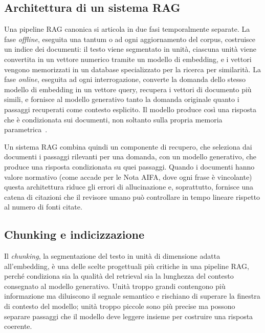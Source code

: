 \subsection{Architettura di un sistema RAG}
\label{subsec:rag-arch}

Una pipeline RAG canonica si articola in due fasi temporalmente separate.
La fase \emph{offline}, eseguita una tantum o ad ogni aggiornamento
del corpus, costruisce un indice dei documenti: il testo viene segmentato
in unità, ciascuna unità viene convertita in un vettore numerico tramite un
modello di embedding, e i vettori vengono memorizzati in un database
specializzato per la ricerca per similarità. La fase \emph{online}, eseguita
ad ogni interrogazione, converte la domanda dello stesso modello di
embedding in un vettore query, recupera i vettori di documento più simili,
e fornisce al modello generativo tanto la domanda originale quanto i passaggi
recuperati come contesto esplicito. Il modello produce così una risposta
che è condizionata sui documenti, non soltanto sulla propria memoria
parametrica~\cite{gao2023ragsurvey}.

Un sistema RAG combina quindi un componente di recupero, che seleziona dai
documenti i passaggi rilevanti per una domanda, con un modello generativo,
che produce una risposta condizionata su quei passaggi. Quando i documenti
hanno valore normativo (come accade per le Nota AIFA, dove ogni frase
è vincolante) questa architettura riduce gli errori di allucinazione e,
soprattutto, fornisce una catena di citazioni che il revisore umano può
controllare in tempo lineare rispetto al numero di fonti citate.

\subsection{Chunking e indicizzazione}
\label{subsec:chunking}

Il \emph{chunking}, la segmentazione del testo in unità di dimensione
adatta all'embedding, è una delle scelte progettuali più critiche in
una pipeline RAG, perché condiziona sia la qualità del retrieval sia la
lunghezza del contesto consegnato al modello generativo. Unità troppo grandi
contengono più informazione ma diluiscono il segnale semantico e rischiano
di superare la finestra di contesto del modello; unità troppo piccole sono
più precise ma possono separare passaggi che il modello deve leggere insieme
per costruire una risposta coerente.

